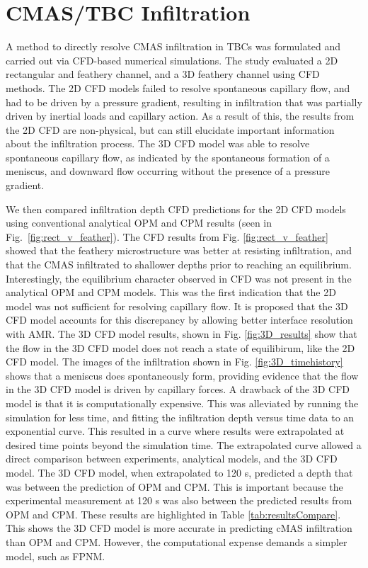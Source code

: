 \documentclass{UCF_ETD}
\begin{document}
\section{CMAS/TBC Infiltration}
\label{sec:cmas_conc}
A method to directly resolve CMAS infiltration in TBCs was formulated and carried out via CFD-based numerical simulations. 
The study evaluated a 2D rectangular and feathery channel, and a 3D feathery channel using CFD methods. 
The 2D CFD models failed to resolve spontaneous capillary flow, and had to be driven by a pressure gradient, resulting in infiltration that was partially driven by inertial loads and capillary action.
As a result of this, the results from the 2D CFD are non-physical, but can still elucidate important information about the infiltration process.
The 3D CFD model was able to resolve spontaneous capillary flow, as indicated by the spontaneous formation of a meniscus, and downward flow occurring without the presence of a pressure gradient.


We then compared infiltration depth CFD predictions for the 2D CFD models using conventional analytical OPM and CPM results (seen in Fig.~\ref{fig:rect_v_feather}). 
The CFD results from Fig. \ref{fig:rect_v_feather} showed that the feathery microstructure was better at resisting infiltration, and that the CMAS infiltrated to shallower depths prior to reaching an equilibrium. 
Interestingly, the equilibrium character observed in CFD was not present in the analytical OPM and CPM models. This was the first indication that the 2D model was not sufficient for resolving capillary flow.
It is proposed that the 3D CFD model accounts for this discrepancy by allowing better interface resolution with AMR. The 3D CFD model results, shown in Fig. \ref{fig:3D_results} show that the flow in the 3D CFD model does not reach a state of equilibirum, like the 2D CFD model.
The images of the infiltration shown in Fig. \ref{fig:3D_timehistory} shows that a meniscus does spontaneously form, providing evidence that the flow in the 3D CFD model is driven by capillary forces.
A drawback of the 3D CFD model is that it is computationally expensive. This was alleviated by running the simulation for less time, and fitting the infiltration depth versus time data to an exponential curve. This resulted in a curve where results were extrapolated at desired time points beyond the simulation time. The extrapolated curve allowed a direct comparison between experiments, analytical models, and the 3D CFD model.
The 3D CFD model, when extrapolated to 120 s, predicted a depth that was between the prediction of OPM and CPM. This is important because the experimental measurement at 120 s was also between the predicted results from OPM and CPM. These results are highlighted in Table \ref{tab:resultsCompare}. This shows the 3D CFD model is more accurate in predicting cMAS infiltration than OPM and CPM. However, the computational expense demands a simpler model, such as FPNM.
\end{document}
